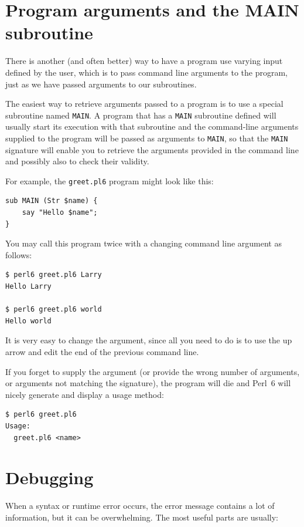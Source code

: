 \section{Program arguments and the MAIN subroutine}
\label{MAIN}

There is another (and often better) way to have a program 
use varying input defined by the user, which is to pass 
command line arguments to the program, just as we have 
passed arguments to our subroutines.

The easiest way to retrieve arguments passed to a program is 
to use a special subroutine named \verb'MAIN'. A program that 
has a \verb'MAIN' subroutine defined will usually start its execution 
with that subroutine and the command-line arguments supplied 
to the program will be passed as arguments to \verb'MAIN', 
so that the \verb'MAIN' signature will enable you to 
retrieve the arguments provided in the command line and 
possibly also to check their validity.

For example, the {\tt greet.pl6} program might look like 
this:
\begin{verbatim}
sub MAIN (Str $name) {
    say "Hello $name";
}
\end{verbatim}

You may call this program twice with a changing command line 
argument as follows:

\begin{verbatim}
$ perl6 greet.pl6 Larry
Hello Larry

$ perl6 greet.pl6 world
Hello world
\end{verbatim}

It is very easy to change the argument, since all you need 
to do is to use the up arrow and edit the end of the 
previous command line.

If you forget to supply the argument (or provide the wrong 
number of arguments, or arguments not matching the signature), 
the program will die and Perl~6 will nicely generate and 
display a usage method:

\begin{verbatim}
$ perl6 greet.pl6
Usage:
  greet.pl6 <name>
\end{verbatim}


\section{Debugging}
\label{whitespace}

When a syntax or runtime error occurs, the error message contains
a lot of information, but it can be overwhelming.  The most
useful parts are usually:

